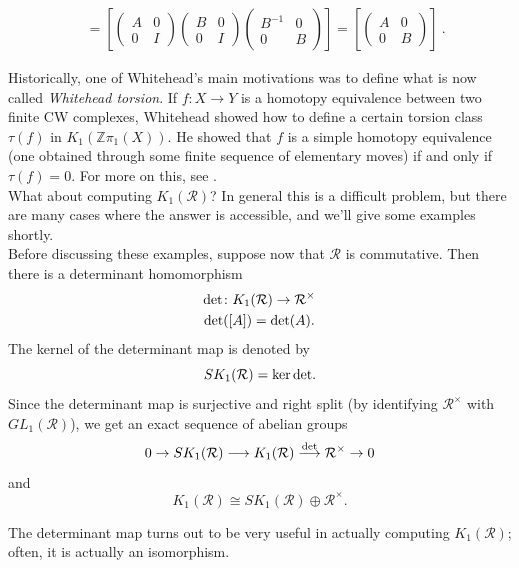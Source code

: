 \documentclass{amsart}
\theoremstyle{definition}
\theoremstyle{definition}
\newcommand{\calR}{\mathcal{R}}
\newcommand{\deter}{\textnormal{det}}
\numberwithin{equation}{subsection}
\begin{document}
\begin{enumerate}
\begin{align*}
  &= \left[\begin{pmatrix} A & 0 \\ 0 & I\end{pmatrix} \begin{pmatrix} B & 0 \\ 0 & I \end{pmatrix} \begin{pmatrix} B^{-1} & 0 \\ 0 & B \end{pmatrix}\right] = \left[\begin{pmatrix} A & 0 \\ 0 & B \end{pmatrix}\right]\ .
  \end{align*}
\end{enumerate}

Historically, one of Whitehead's main motivations was to define what is now called {\it Whitehead torsion}. If $f \colon X \to Y$ is a homotopy equivalence between two finite CW complexes, Whitehead showed how to define a certain torsion class $\tau(f)$ in $K_{1}(\mathbb{Z}\pi_{1}(X))$. He showed that $f$ is a simple homotopy equivalence (one obtained through some finite sequence of elementary moves) if and only if $\tau(f) = 0$. For more on this, see \cite[Section 2.4]{RosenbergBook}.\\

What about computing $K_{1}(\calR)$? In general this is a difficult problem, but there are many cases where the answer is accessible, and we'll give some examples shortly. \\

Before discussing these examples, suppose now that $\calR$ is commutative. Then there is a determinant homomorphism
\begin{gather*}
\deter \colon K_{1}(\calR) \to \calR^{\times}\\
\deter([A]) = \deter(A).
\end{gather*}
The kernel of the determinant map is denoted by
$$SK_{1}(\calR) = \ker \deter.$$
Since the determinant map is surjective and right split (by identifying $\calR^{\times}$ with $GL_{1}(\calR)$), we get an exact sequence of abelian groups
$$0 \to SK_{1}(\calR) \longrightarrow K_{1}(\calR) \stackrel{\deter}\longrightarrow \calR^{\times} \to 0$$
and
$$K_{1}(\calR) \cong SK_{1}(\calR) \oplus \calR^{\times}.$$

The determinant map turns out to be very useful in actually computing $K_{1}(\calR)$; often, it is actually an isomorphism.\\
\end{document}
